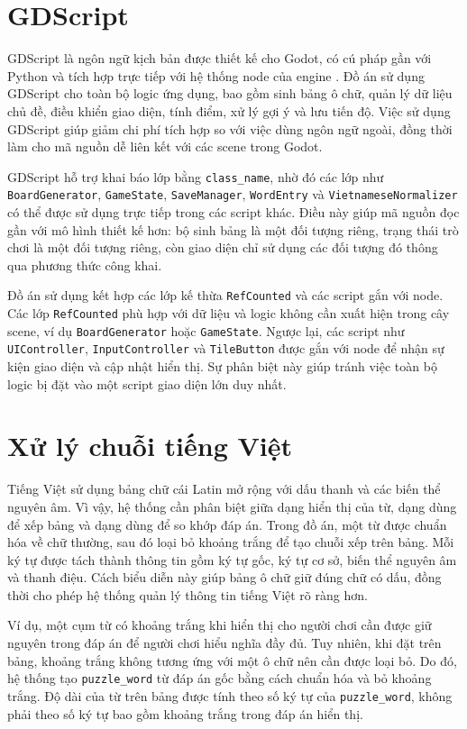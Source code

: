 \documentclass[../DoAn.tex]{subfiles}
\begin{document}
\section{GDScript}
GDScript là ngôn ngữ kịch bản được thiết kế cho Godot, có cú pháp gần với Python và tích hợp trực tiếp với hệ thống node của engine \cite{godotGDScript}. Đồ án sử dụng GDScript cho toàn bộ logic ứng dụng, bao gồm sinh bảng ô chữ, quản lý dữ liệu chủ đề, điều khiển giao diện, tính điểm, xử lý gợi ý và lưu tiến độ. Việc sử dụng GDScript giúp giảm chi phí tích hợp so với việc dùng ngôn ngữ ngoài, đồng thời làm cho mã nguồn dễ liên kết với các scene trong Godot.

GDScript hỗ trợ khai báo lớp bằng \texttt{class\_name}, nhờ đó các lớp như \texttt{BoardGenerator}, \texttt{GameState}, \texttt{SaveManager}, \texttt{WordEntry} và \texttt{VietnameseNormalizer} có thể được sử dụng trực tiếp trong các script khác. Điều này giúp mã nguồn đọc gần với mô hình thiết kế hơn: bộ sinh bảng là một đối tượng riêng, trạng thái trò chơi là một đối tượng riêng, còn giao diện chỉ sử dụng các đối tượng đó thông qua phương thức công khai.

Đồ án sử dụng kết hợp các lớp kế thừa \texttt{RefCounted} và các script gắn với node. Các lớp \texttt{RefCounted} phù hợp với dữ liệu và logic không cần xuất hiện trong cây scene, ví dụ \texttt{BoardGenerator} hoặc \texttt{GameState}. Ngược lại, các script như \texttt{UIController}, \texttt{InputController} và \texttt{TileButton} được gắn với node để nhận sự kiện giao diện và cập nhật hiển thị. Sự phân biệt này giúp tránh việc toàn bộ logic bị đặt vào một script giao diện lớn duy nhất.

\section{Xử lý chuỗi tiếng Việt}
Tiếng Việt sử dụng bảng chữ cái Latin mở rộng với dấu thanh và các biến thể nguyên âm. Vì vậy, hệ thống cần phân biệt giữa dạng hiển thị của từ, dạng dùng để xếp bảng và dạng dùng để so khớp đáp án. Trong đồ án, một từ được chuẩn hóa về chữ thường, sau đó loại bỏ khoảng trắng để tạo chuỗi xếp trên bảng. Mỗi ký tự được tách thành thông tin gồm ký tự gốc, ký tự cơ sở, biến thể nguyên âm và thanh điệu. Cách biểu diễn này giúp bảng ô chữ giữ đúng chữ có dấu, đồng thời cho phép hệ thống quản lý thông tin tiếng Việt rõ ràng hơn.

Ví dụ, một cụm từ có khoảng trắng khi hiển thị cho người chơi cần được giữ nguyên trong đáp án để người chơi hiểu nghĩa đầy đủ. Tuy nhiên, khi đặt trên bảng, khoảng trắng không tương ứng với một ô chữ nên cần được loại bỏ. Do đó, hệ thống tạo \texttt{puzzle\_word} từ đáp án gốc bằng cách chuẩn hóa và bỏ khoảng trắng. Độ dài của từ trên bảng được tính theo số ký tự của \texttt{puzzle\_word}, không phải theo số ký tự bao gồm khoảng trắng trong đáp án hiển thị.
\end{document}
